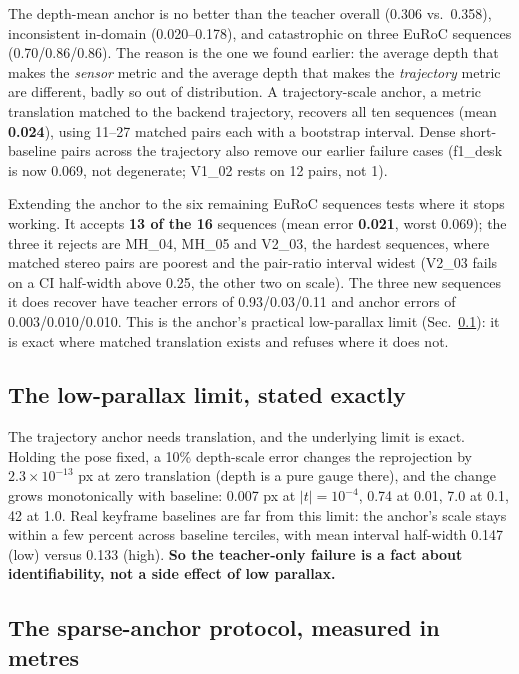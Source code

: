 \noindent The depth-mean anchor is no better than the teacher overall (0.306 vs.\
0.358), inconsistent in-domain (0.020--0.178), and catastrophic on three EuRoC
sequences (0.70/0.86/0.86). The reason is the one we found earlier: the average
depth that makes the \emph{sensor} metric and the average depth that makes the
\emph{trajectory} metric are different, badly so out of distribution. A
trajectory-scale anchor, a metric translation matched to the backend trajectory,
recovers all ten sequences (mean \textbf{0.024}), using 11--27 matched pairs each
with a bootstrap interval. Dense short-baseline pairs across the trajectory also
remove our earlier failure cases (f1\_desk is now 0.069, not degenerate; V1\_02
rests on 12 pairs, not 1).

Extending the anchor to the six remaining EuRoC sequences tests where it stops
working. It accepts \textbf{13 of the 16} sequences (mean error \textbf{0.021},
worst 0.069); the three it rejects are MH\_04, MH\_05 and V2\_03, the hardest
sequences, where matched stereo pairs are poorest and the pair-ratio interval
widest (V2\_03 fails on a CI half-width above 0.25, the other two on scale). The
three new sequences it does recover have teacher errors of 0.93/0.03/0.11 and
anchor errors of 0.003/0.010/0.010. This is the anchor's practical low-parallax
limit (Sec.~\ref{sec:lowpar}): it is exact where matched translation exists and
refuses where it does not.

\subsection{The low-parallax limit, stated exactly}
\label{sec:lowpar}

The trajectory anchor needs translation, and the underlying limit is exact.
Holding the pose fixed, a 10\% depth-scale error changes the reprojection by
$2.3\times10^{-13}$ px at zero translation (depth is a pure gauge there), and the
change grows monotonically with baseline: 0.007 px at $|t|=10^{-4}$, 0.74 at
0.01, 7.0 at 0.1, 42 at 1.0. Real keyframe baselines are far from this limit: the
anchor's scale stays within a few percent across baseline terciles, with mean
interval half-width 0.147 (low) versus 0.133 (high). \textbf{So the
teacher-only failure is a fact about identifiability, not a side effect of low
parallax.}

\subsection{The sparse-anchor protocol, measured in metres}
\label{sec:protocol}

